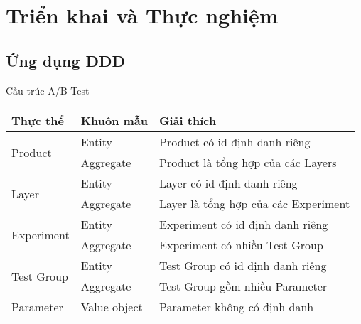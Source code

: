 \section{Triển khai và Thực nghiệm}

\subsection{Ứng dụng DDD}

\begin{frame}{Cấu trúc A/B Test}
	\begin{table}
		\begin{tabular}{|l|l|l|}
			\hline
			Thực thể                    & Khuôn mẫu    & Giải thích                           \\ \hline
			\multirow{2}{*}{Product}    & Entity       & Product có id định danh riêng        \\ \cline{2-3}
			                            & Aggregate    & Product là tổng hợp của các Layers   \\ \hline
			\multirow{2}{*}{Layer}      & Entity       & Layer có id định danh riêng          \\ \cline{2-3}
			                            & Aggregate    & Layer là tổng hợp của các Experiment \\ \hline
			\multirow{2}{*}{Experiment} & Entity       & Experiment có id định danh riêng     \\ \cline{2-3}
			                            & Aggregate    & Experiment có nhiều Test Group       \\ \hline
			\multirow{2}{*}{Test Group} & Entity       & Test Group có id định danh riêng     \\ \cline{2-3}
			                            & Aggregate    & Test Group gồm nhiều Parameter       \\ \hline
			Parameter                   & Value object & Parameter không có định danh         \\ \hline
		\end{tabular}
	\end{table}
\end{frame}


